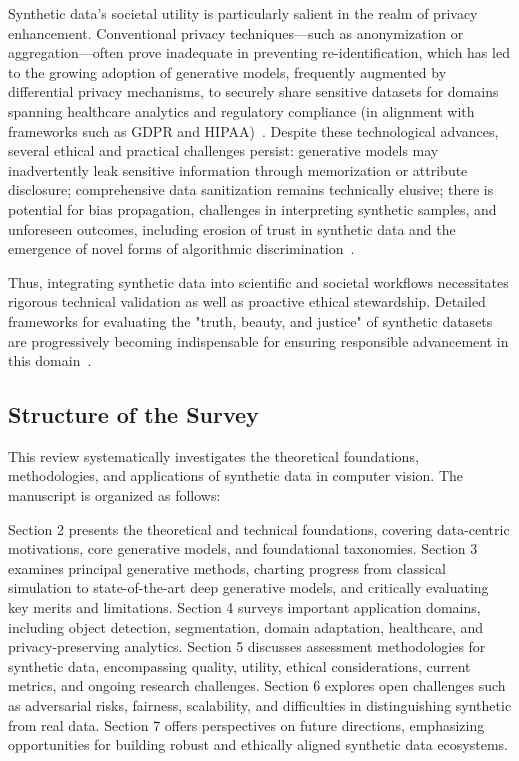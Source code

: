 \documentclass[sigconf]{acmart}
\begin{document}
Synthetic data’s societal utility is particularly salient in the realm of privacy enhancement. Conventional privacy techniques—such as anonymization or aggregation—often prove inadequate in preventing re-identification, which has led to the growing adoption of generative models, frequently augmented by differential privacy mechanisms, to securely share sensitive datasets for domains spanning healthcare analytics and regulatory compliance (in alignment with frameworks such as GDPR and HIPAA)~\cite{ref5,ref6,ref12,ref13}. Despite these technological advances, several ethical and practical challenges persist: generative models may inadvertently leak sensitive information through memorization or attribute disclosure; comprehensive data sanitization remains technically elusive; there is potential for bias propagation, challenges in interpreting synthetic samples, and unforeseen outcomes, including erosion of trust in synthetic data and the emergence of novel forms of algorithmic discrimination~\cite{ref12,ref35,ref87}.

Thus, integrating synthetic data into scientific and societal workflows necessitates rigorous technical validation as well as proactive ethical stewardship. Detailed frameworks for evaluating the "truth, beauty, and justice" of synthetic datasets are progressively becoming indispensable for ensuring responsible advancement in this domain~\cite{ref14,ref87}.

\subsection{Structure of the Survey}

This review systematically investigates the theoretical foundations, methodologies, and applications of synthetic data in computer vision. The manuscript is organized as follows:

Section 2 presents the theoretical and technical foundations, covering data-centric motivations, core generative models, and foundational taxonomies. Section 3 examines principal generative methods, charting progress from classical simulation to state-of-the-art deep generative models, and critically evaluating key merits and limitations. Section 4 surveys important application domains, including object detection, segmentation, domain adaptation, healthcare, and privacy-preserving analytics. Section 5 discusses assessment methodologies for synthetic data, encompassing quality, utility, ethical considerations, current metrics, and ongoing research challenges. Section 6 explores open challenges such as adversarial risks, fairness, scalability, and difficulties in distinguishing synthetic from real data. Section 7 offers perspectives on future directions, emphasizing opportunities for building robust and ethically aligned synthetic data ecosystems.
\end{document}
